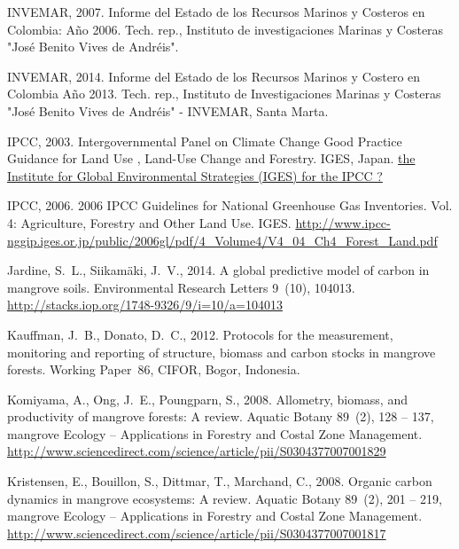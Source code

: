 \documentclass[review, authoryear]{elsarticle}   	%
\begin{document}
\begin{thebibliography}{51}
INVEMAR, 2007. {Informe del Estado de los Recursos Marinos y Costeros en
  Colombia: A\~{n}o 2006}. Tech. rep., Instituto de investigaciones Marinas y
  Costeras "Jos\'{e} Benito Vives de Andr\'{e}is".

INVEMAR, 2014. {Informe del Estado de los Recursos Marinos y Costero en
  Colombia A\~{n}o 2013}. Tech. rep., Instituto de Investigaciones Marinas y
  Costeras "Jos\'{e} Benito Vives de Andr\'{e}is" - INVEMAR, Santa Marta.

IPCC, 2003. {Intergovernmental Panel on Climate Change Good Practice Guidance
  for Land Use , Land-Use Change and Forestry}. IGES, Japan.
\newline\urlprefix\url{the Institute for Global Environmental Strategies (IGES)
  for the IPCC ?}

IPCC, 2006. {2006 IPCC Guidelines for National Greenhouse Gas Inventories}.
  Vol. 4: Agriculture, Forestry and Other Land Use. IGES.
\newline\urlprefix\url{http://www.ipcc-nggip.iges.or.jp/public/2006gl/pdf/4\_Volume4/V4\_04\_Ch4\_Forest\_Land.pdf}

Jardine, S.~L., Siikam{\"a}ki, J.~V., 2014. A global predictive model of carbon
  in mangrove soils. Environmental Research Letters 9~(10), 104013.
\newline\urlprefix\url{http://stacks.iop.org/1748-9326/9/i=10/a=104013}

Kauffman, J.~B., Donato, D.~C., 2012. {Protocols for the measurement,
  monitoring and reporting of structure, biomass and carbon stocks in mangrove
  forests}. Working Paper~86, CIFOR, Bogor, Indonesia.

Komiyama, A., Ong, J.~E., Poungparn, S., 2008. Allometry, biomass, and
  productivity of mangrove forests: A review. Aquatic Botany 89~(2), 128 --
  137, mangrove Ecology -- Applications in Forestry and Costal Zone Management.
\newline\urlprefix\url{http://www.sciencedirect.com/science/article/pii/S0304377007001829}

Kristensen, E., Bouillon, S., Dittmar, T., Marchand, C., 2008. Organic carbon
  dynamics in mangrove ecosystems: A review. Aquatic Botany 89~(2), 201 -- 219,
  mangrove Ecology -- Applications in Forestry and Costal Zone Management.
\newline\urlprefix\url{http://www.sciencedirect.com/science/article/pii/S0304377007001817}


\end{thebibliography}
\end{document}
